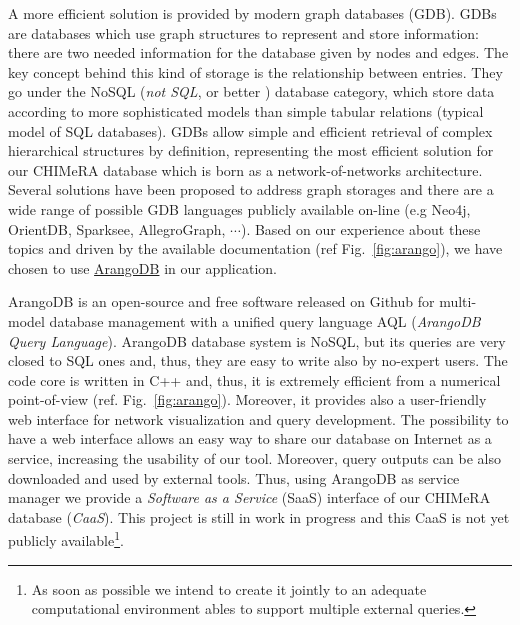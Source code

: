 \documentclass{standalone}
\begin{document}
A more efficient solution is provided by modern graph databases (GDB).
GDBs are databases which use graph structures to represent and store information: there are two needed information for the database given by nodes and edges.
The key concept behind this kind of storage is the relationship between entries.
They go under the \textsf{NoSQL} (\emph{not SQL}, or better ) database category, which store data according to more sophisticated models than simple tabular relations (typical model of \textsf{SQL} databases).
GDBs allow simple and efficient retrieval of complex hierarchical structures by definition, representing the most efficient solution for our \textsf{CHIMeRA} database which is born as a network-of-networks architecture.
Several solutions have been proposed to address graph storages and there are a wide range of possible GDB languages publicly available on-line (e.g \textsf{Neo4j}, \textsf{OrientDB}, \textsf{Sparksee}, \textsf{AllegroGraph}, $\cdots$).
Based on our experience about these topics and driven by the available documentation (ref Fig.~\ref{fig:arango}), we have chosen to use \href{https://www.arangodb.com/}{\textsf{ArangoDB}} in our application.

\textsf{ArangoDB} is an open-source and free software released on Github for multi-model database management with a unified query language \textsf{AQL} (\emph{ArangoDB Query Language}).
\textsf{ArangoDB} database system is \textsf{NoSQL}, but its queries are very closed to \textsf{SQL} ones and, thus, they are easy to write also by no-expert users.
The code core is written in \textsf{C++} and, thus, it is extremely efficient from a numerical point-of-view (ref. Fig.~\ref{fig:arango}).
Moreover, it provides also a user-friendly web interface for network visualization and query development.
The possibility to have a web interface allows an easy way to share our database on Internet as a service, increasing the usability of our tool.
Moreover, query outputs can be also downloaded and used by external tools.
Thus, using \textsf{ArangoDB} as service manager we provide a \emph{Software as a Service} (SaaS) interface of our \textsf{CHIMeRA} database (\emph{CaaS}).
This project is still in work in progress and this CaaS is not yet publicly available\footnote{
  As soon as possible we intend to create it jointly to an adequate computational environment ables to support multiple external queries.
}.
\end{document}
